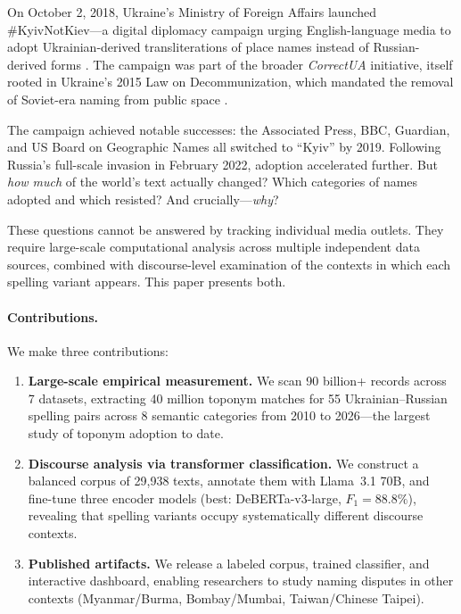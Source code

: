 \documentclass{article}
\begin{document}
On October 2, 2018, Ukraine's Ministry of Foreign Affairs launched \#KyivNotKiev---a digital diplomacy campaign urging English-language media to adopt Ukrainian-derived transliterations of place names instead of Russian-derived forms \citep{kyivnotkiev-wiki}. The campaign was part of the broader \textit{CorrectUA} initiative, itself rooted in Ukraine's 2015 Law on Decommunization, which mandated the removal of Soviet-era naming from public space \citep{decommunization-law}.

The campaign achieved notable successes: the Associated Press, BBC, Guardian, and US Board on Geographic Names all switched to ``Kyiv'' by 2019. Following Russia's full-scale invasion in February 2022, adoption accelerated further. But \textit{how much} of the world's text actually changed? Which categories of names adopted and which resisted? And crucially---\textit{why}?

These questions cannot be answered by tracking individual media outlets. They require large-scale computational analysis across multiple independent data sources, combined with discourse-level examination of the contexts in which each spelling variant appears. This paper presents both.

\paragraph{Contributions.} We make three contributions:

\begin{enumerate}
\item \textbf{Large-scale empirical measurement.} We scan 90 billion+ records across 7 datasets, extracting 40 million toponym matches for 55 Ukrainian--Russian spelling pairs across 8 semantic categories from 2010 to 2026---the largest study of toponym adoption to date.

\item \textbf{Discourse analysis via transformer classification.} We construct a balanced corpus of 29,938 texts, annotate them with Llama~3.1 70B, and fine-tune three encoder models (best: DeBERTa-v3-large, $F_1 = 88.8\%$), revealing that spelling variants occupy systematically different discourse contexts.

\item \textbf{Published artifacts.} We release a labeled corpus, trained classifier, and interactive dashboard, enabling researchers to study naming disputes in other contexts (Myanmar/Burma, Bombay/Mumbai, Taiwan/Chinese Taipei).
\end{enumerate}
\end{document}
